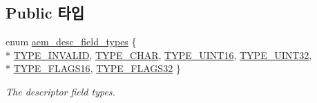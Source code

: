 \subsection*{Public 타입}
\begin{DoxyCompactItemize}
\item 
enum \hyperlink{classavdecc__lib_1_1descriptor__field_afcc9e2e668064d50ec69a4f95b154396}{aem\+\_\+desc\+\_\+field\+\_\+types} \{ \\*
\hyperlink{classavdecc__lib_1_1descriptor__field_afcc9e2e668064d50ec69a4f95b154396afeec3d92b10ebeaa68bbb56e4d08691c}{T\+Y\+P\+E\+\_\+\+I\+N\+V\+A\+L\+ID}, 
\hyperlink{classavdecc__lib_1_1descriptor__field_afcc9e2e668064d50ec69a4f95b154396a2c8735de6cf799483eefed0e90a386f5}{T\+Y\+P\+E\+\_\+\+C\+H\+AR}, 
\hyperlink{classavdecc__lib_1_1descriptor__field_afcc9e2e668064d50ec69a4f95b154396ac476ff4afefdbf17ca690f6606472d64}{T\+Y\+P\+E\+\_\+\+U\+I\+N\+T16}, 
\hyperlink{classavdecc__lib_1_1descriptor__field_afcc9e2e668064d50ec69a4f95b154396ab799ec7307bc71b0219c60e5853e50a4}{T\+Y\+P\+E\+\_\+\+U\+I\+N\+T32}, 
\\*
\hyperlink{classavdecc__lib_1_1descriptor__field_afcc9e2e668064d50ec69a4f95b154396a9d459becf9813d51539fcc01e36201fd}{T\+Y\+P\+E\+\_\+\+F\+L\+A\+G\+S16}, 
\hyperlink{classavdecc__lib_1_1descriptor__field_afcc9e2e668064d50ec69a4f95b154396a797f2aadec8284c40a163c649e46b411}{T\+Y\+P\+E\+\_\+\+F\+L\+A\+G\+S32}
 \}\begin{DoxyCompactList}\small\item\em The descriptor field types. \end{DoxyCompactList}
\end{DoxyCompactItemize}
